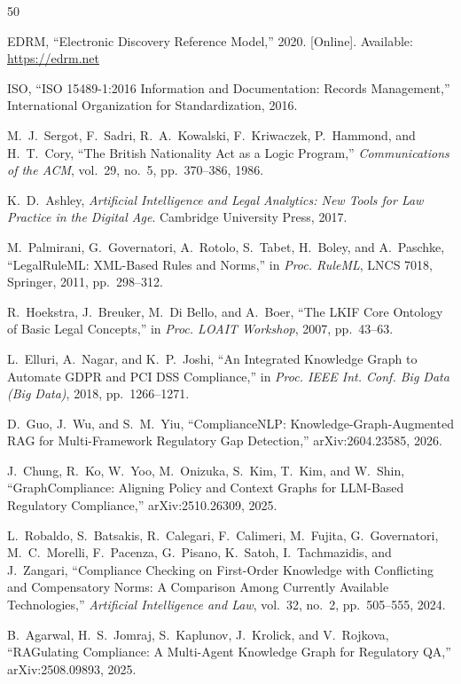\documentclass{ieeeaccess}
\begin{document}
\begin{thebibliography}{50}

EDRM, ``Electronic Discovery Reference Model,'' 2020. [Online]. Available: \url{https://edrm.net}

ISO, ``ISO 15489-1:2016 Information and Documentation: Records Management,'' International Organization for Standardization, 2016.

M.~J.~Sergot, F.~Sadri, R.~A.~Kowalski, F.~Kriwaczek, P.~Hammond, and H.~T.~Cory, ``The British Nationality Act as a Logic Program,'' \textit{Communications of the ACM}, vol.~29, no.~5, pp.~370--386, 1986.

K.~D.~Ashley, \textit{Artificial Intelligence and Legal Analytics: New Tools for Law Practice in the Digital Age}. Cambridge University Press, 2017.

M.~Palmirani, G.~Governatori, A.~Rotolo, S.~Tabet, H.~Boley, and A.~Paschke, ``LegalRuleML: XML-Based Rules and Norms,'' in \textit{Proc. RuleML}, LNCS 7018, Springer, 2011, pp.~298--312.

R.~Hoekstra, J.~Breuker, M.~Di Bello, and A.~Boer, ``The LKIF Core Ontology of Basic Legal Concepts,'' in \textit{Proc. LOAIT Workshop}, 2007, pp.~43--63.

L.~Elluri, A.~Nagar, and K.~P.~Joshi, ``An Integrated Knowledge Graph to Automate GDPR and PCI DSS Compliance,'' in \textit{Proc. IEEE Int. Conf. Big Data (Big Data)}, 2018, pp.~1266--1271.

D.~Guo, J.~Wu, and S.~M.~Yiu, ``ComplianceNLP: Knowledge-Graph-Augmented RAG for Multi-Framework Regulatory Gap Detection,'' arXiv:2604.23585, 2026.

J.~Chung, R.~Ko, W.~Yoo, M.~Onizuka, S.~Kim, T.~Kim, and W.~Shin, ``GraphCompliance: Aligning Policy and Context Graphs for LLM-Based Regulatory Compliance,'' arXiv:2510.26309, 2025.

L.~Robaldo, S.~Batsakis, R.~Calegari, F.~Calimeri, M.~Fujita, G.~Governatori, M.~C.~Morelli, F.~Pacenza, G.~Pisano, K.~Satoh, I.~Tachmazidis, and J.~Zangari, ``Compliance Checking on First-Order Knowledge with Conflicting and Compensatory Norms: A Comparison Among Currently Available Technologies,'' \textit{Artificial Intelligence and Law}, vol.~32, no.~2, pp.~505--555, 2024.

B.~Agarwal, H.~S.~Jomraj, S.~Kaplunov, J.~Krolick, and V.~Rojkova, ``RAGulating Compliance: A Multi-Agent Knowledge Graph for Regulatory QA,'' arXiv:2508.09893, 2025.


\end{thebibliography}
\end{document}

